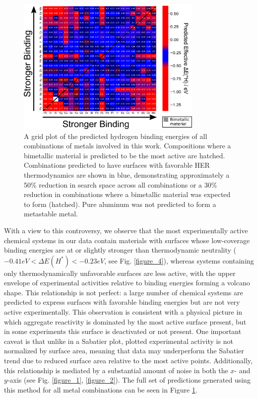 \documentclass[preprint,12pt]{elsarticle}
\begin{document}
\begin{figure}[h]
\centering
    \includegraphics[width=0.8\textwidth]{figures/fig_5.pdf}
\caption{A grid plot of the predicted hydrogen binding energies of all combinations of metals involved in this work. Compositions where a bimetallic material is predicted to be the most active are hatched. Combinations predicted to have surfaces with favorable HER thermodynamics are shown in blue, demonstrating approximately a 50\% reduction in search space across all combinations or a 30\% reduction in combinations where a bimetallic material was expected to form (hatched). Pure aluminum was not predicted to form a metastable metal.
}
\label{figure_5}
\end{figure}

With a view to this controversy, we observe that the most experimentally active chemical systems in our data contain materials with surfaces whose low-coverage binding energies are at or slightly stronger than thermodynamic neutrality ($-0.41 eV < \Delta E(H^*) < -0.23 eV$, see Fig. \ref{figure_4}), whereas systems containing only thermodynamically unfavorable surfaces are less active, with the upper envelope of experimental activities relative to binding energies forming a volcano shape. This relationship is not perfect: a large number of chemical systems are predicted to express surfaces with favorable binding energies but are not very active experimentally. This observation is consistent with a physical picture in which aggregate reactivity is dominated by the most active surface present, but in some experiments this surface is deactivated or not present. One important caveat is that unlike in a Sabatier plot, plotted experimental activity is not normalized by surface area, meaning that data may underperform the Sabatier trend due to reduced surface area relative to the most active points. Additionally, this relationship is mediated by a substantial amount of noise in both the $x$- and $y$-axis (see Fig. \ref{figure_1}, \ref{figure_2}). The full set of predictions generated using this method for all metal combinations can be seen in Figure \ref{figure_5}.
\end{document}
